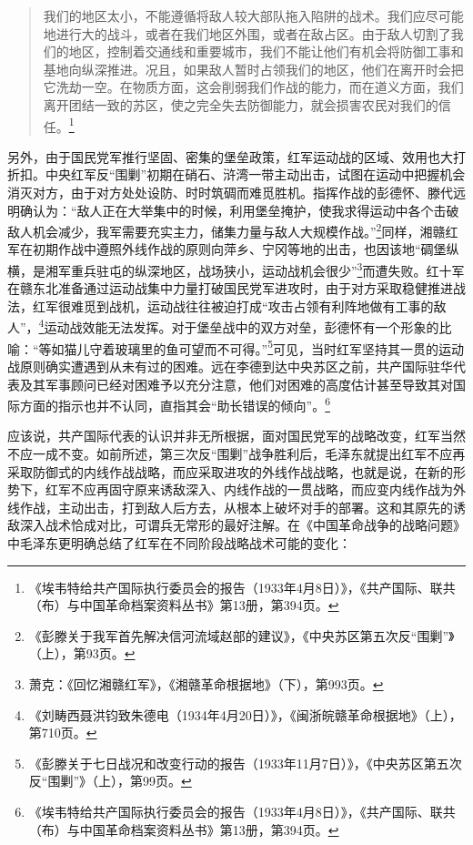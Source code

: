 \begin{quote}

我们的地区太小，不能遵循将敌人较大部队拖入陷阱的战术。我们应尽可能地进行大的战斗，或者在我们地区外围，或者在敌占区。由于敌人切割了我们的地区，控制着交通线和重要城市，我们不能让他们有机会将防御工事和基地向纵深推进。况且，如果敌人暂时占领我们的地区，他们在离开时会把它洗劫一空。在物质方面，这会削弱我们作战的能力，而在道义方面，我们离开团结一致的苏区，使之完全失去防御能力，就会损害农民对我们的信任。\footnote{《埃韦特给共产国际执行委员会的报告（1933年4月8日）》，《共产国际、联共（布）与中国革命档案资料丛书》第13册，第394页。}
\end{quote}


另外，由于国民党军推行坚固、密集的堡垒政策，红军运动战的区域、效用也大打折扣。中央红军反“围剿”初期在硝石、浒湾一带主动出击，试图在运动中把握机会消灭对方，由于对方处处设防、时时筑碉而难觅胜机。指挥作战的彭德怀、滕代远明确认为：“敌人正在大举集中的时候，利用堡垒掩护，使我求得运动中各个击破敌人机会减少，我军需要充实主力，储集力量与敌人大规模作战。”\footnote{《彭滕关于我军首先解决信河流域赵部的建议》，《中央苏区第五次反“围剿”》（上），第93页。}同样，湘赣红军在初期作战中遵照外线作战的原则向萍乡、宁冈等地的出击，也因该地“碉堡纵横，是湘军重兵驻屯的纵深地区，战场狭小，运动战机会很少”\footnote{萧克：《回忆湘赣红军》，《湘赣革命根据地》（下），第993页。}而遭失败。红十军在赣东北准备通过运动战集中力量打破国民党军进攻时，由于对方采取稳健推进战法，红军很难觅到战机，运动战往往被迫打成“攻击占领有利阵地做有工事的敌人”，\footnote{《刘畴西聂洪钧致朱德电（1934年4月20日）》，《闽浙皖赣革命根据地》（上），第710页。}运动战效能无法发挥。对于堡垒战中的双方对垒，彭德怀有一个形象的比喻：“等如猫儿守着玻璃里的鱼可望而不可得。”\footnote{《彭滕关于七日战况和改变行动的报告（1933年11月7日）》，《中央苏区第五次反“围剿”》（上），第99页。}可见，当时红军坚持其一贯的运动战原则确实遭遇到从未有过的困难。远在李德到达中央苏区之前，共产国际驻华代表及其军事顾问已经对困难予以充分注意，他们对困难的高度估计甚至导致其对国际方面的指示也并不认同，直指其会“助长错误的倾向”。\footnote{《埃韦特给共产国际执行委员会的报告（1933年4月8日）》，《共产国际、联共（布）与中国革命档案资料丛书》第13册，第394页。}


应该说，共产国际代表的认识并非无所根据，面对国民党军的战略改变，红军当然不应一成不变。如前所述，第三次反“围剿”战争胜利后，毛泽东就提出红军不应再采取防御式的内线作战战略，而应采取进攻的外线作战战略，也就是说，在新的形势下，红军不应再固守原来诱敌深入、内线作战的一贯战略，而应变内线作战为外线作战，主动出击，打到敌人后方去，从根本上破坏对手的部署。这和其原先的诱敌深入战术恰成对比，可谓兵无常形的最好注解。在《中国革命战争的战略问题》中毛泽东更明确总结了红军在不同阶段战略战术可能的变化：

